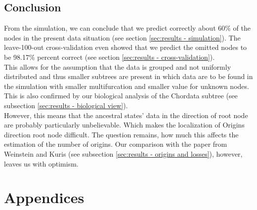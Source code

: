   \section{Conclusion}

    From the simulation, we can conclude that we predict correctly about 60\% of the nodes in the 
      present data situation (see section \ref{sec:results - simulation}).
    The leave-100-out cross-validation even showed that we predict the omitted nodes to be 98.17\%  
      percent correct (see section \ref{sec:results - cross-validation}). \\
    This allows for the assumption that the data is grouped and not uniformly distributed and thus 
      smaller subtrees are present in which data are to be found in the simulation with smaller 
      multifurcation and smaller value for unknown nodes. This is also confirmed by our biological 
      analysis of the Chordata subtree (see subsection \ref{sec:results - biological view}). \\
    However, this means that the ancestral states' data in the direction of root node are probably 
      particularly unbelievable. Which makes the localization of Origins direction root node 
      difficult. The question remains, how much this affects the estimation of the number of origins. 
      Our comparison with the paper from Weinstein and Kuris \cite{Weinstein2016} (see subsection 
      \ref{sec:results - origins and losses}), however, leaves us with optimism.



\chapter{Appendices}
